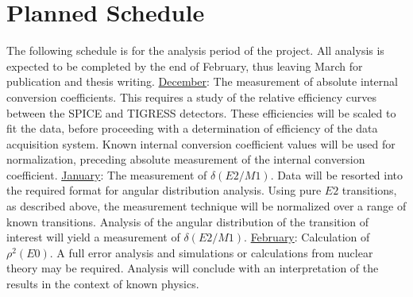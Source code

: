 \documentclass[twocolumn,preprintnumbers,amsmath,amssymb]{revtex4}
\begin{document}
\section{Planned Schedule}
The following schedule is for the analysis period of the project. All analysis is expected to be completed by the end of February, thus leaving March for publication and thesis writing. \newline
\underline{December}: The measurement of absolute internal conversion coefficients. This requires a study of the relative efficiency curves between the SPICE and TIGRESS detectors. These efficiencies will be scaled to fit the data, before proceeding with a determination of efficiency of the data acquisition system. Known internal conversion coefficient values will be used for normalization, preceding absolute measurement of the internal conversion coefficient. \newline 
\underline{January}: The measurement of $\delta(E2/M1)$. Data will be resorted into the required format for angular distribution analysis. Using pure $E2$ transitions, as described above, the measurement technique will be normalized over a range of known transitions. Analysis of the angular distribution of the transition of interest will yield a measurement of $\delta(E2/M1)$. \newline
\underline{February}: Calculation of $\rho^2(E0)$. A full error analysis and simulations or calculations from nuclear theory may be required. Analysis will conclude with an interpretation of the results in the context of known physics. 
\end{document}

